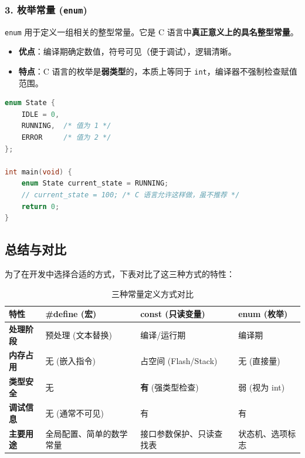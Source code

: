 \subsubsection{3. 枚举常量 (\texttt{enum})}
\texttt{enum} 用于定义一组相关的整型常量。它是 C 语言中\textbf{真正意义上的具名整型常量}。

\begin{itemize}
    \item \textbf{优点}：编译期确定数值，符号可见（便于调试），逻辑清晰。
    \item \textbf{特点}：C 语言的枚举是\textbf{弱类型}的，本质上等同于 \texttt{int}，编译器不强制检查赋值范围。
\end{itemize}

\begin{lstlisting}[language=C, caption={枚举的使用}, label={lst:enum_usage}]
enum State {
    IDLE = 0,
    RUNNING,  /* 值为 1 */
    ERROR     /* 值为 2 */
};

int main(void) {
    enum State current_state = RUNNING;
    // current_state = 100; /* C 语言允许这样做，虽不推荐 */
    return 0;
}
\end{lstlisting}

\subsection{总结与对比}

为了在开发中选择合适的方式，下表对比了这三种方式的特性：

\begin{table}[htbp]
    \centering
    \caption{三种常量定义方式对比}
    \label{tab:const_compare}
    \renewcommand{\arraystretch}{1.3} %
    \begin{tabular}{lp{3cm}p{3cm}p{3cm}}
        \hline
        \textbf{特性} & \textbf{\#define (宏)} & \textbf{const (只读变量)} & \textbf{enum (枚举)} \\
        \hline
        \textbf{处理阶段} & 预处理 (文本替换) & 编译/运行期 & 编译期 \\
        \textbf{内存占用} & 无 (嵌入指令) & 占空间 (Flash/Stack) & 无 (直接量) \\
        \textbf{类型安全} & 无 & \textbf{有} (强类型检查) & 弱 (视为 int) \\
        \textbf{调试信息} & 无 (通常不可见) & 有 & 有 \\
        \textbf{主要用途} & 全局配置、简单的数学常量 & 接口参数保护、只读查找表 & 状态机、选项标志 \\
        \hline
    \end{tabular}
\end{table}















